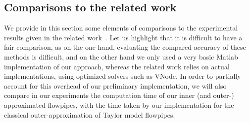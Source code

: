 



\subsection{Comparisons to the related work}
\label{sec:exp_compar}
We provide in this section some elements of comparisons to the experimental results given in the related work~\cite{Underapproxflowpipes,underapprox16}.
Let us highlight that it is difficult to have a fair comparison, as on the one hand, evaluating the compared accuracy of these methods is difficult, 
and on the other hand we only used a very basic Matlab implementation of our approach, whereas the related work relies on actual implementations,
using optimized solvers such as VNode. In order to partially account for this overhead of our preliminary implementation, we will also compare in our experiments 
the computation time of our inner (and outer-) approximated flowpipes, with the time taken by our implementation for the classical outer-approximation 
of Taylor model flowpipes. 

